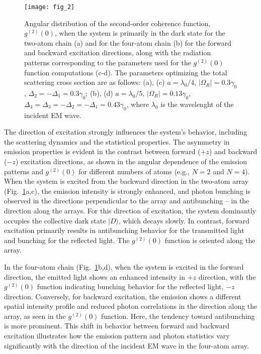 \documentclass[aps,prl,twocolumn,superscriptaddress,showpacs,amsmath,amssymb]{revtex4-2}
\begin{document}
\begin{figure}[h]
    \centering
    \texttt{[image: fig\_2]}
    \caption{Angular distribution of the second-order coherence function, $g^{(2)}(0)$, when the system is primarily in the dark state for the two-atom chain (a) and for the four-atom chain (b) for the forward and backward excitation directions, along with the radiation patterns corresponding to the
    parameters used for the $g^{(2)}(0)$ function computations (c-d). The parameters optimizing the total scattering cross section are as follows: (a), (c) $a = \lambda_0 / 4$, $ \left| \Omega_R \right|= 0.3 \gamma_0$, $\Delta_2 = - \Delta_1 = 0.3 \gamma_0$; (b), (d) $a = \lambda_0 / 5$,
    $\left| \Omega_R \right| = 0.13
\gamma_0$, $\Delta_4 = \Delta_3 = - \Delta_2 = - \Delta_1 = 0.43 \gamma_0$, where $\lambda_0$ is the wavelenght of the incident EM wave.}
    \label{fig:02}
\end{figure}

The direction of excitation strongly influences the system's behavior, including the scattering dynamics and the statistical properties. 
The asymmetry in emission properties is evident in the contrast between forward ($+z$) and backward ($-z$) excitation directions, as shown in the angular dependence of the emission patterns and $g^{(2)}(0)$ for different numbers of atoms (e.g., $N = 2$ and $N = 4$). 
When the system is excited from the backward direction in the two-atom array (Fig.~\ref{fig:02}a,c), the emission intensity is strongly enhanced, and photon bunching is observed in the directions perpendicular to the array and antibunching -- in the direction along the arrays.
For this direction of excitation, the system dominantly occupies the collective dark state $ |D\rangle $, which decays slowly. 
In contrast, forward excitation primarily results in antibunching behavior for the transmitted light and bunching for the reflected light.
The $g^{(2)}(0)$ function is oriented along the array.

In the four-atom chain (Fig.~\ref{fig:02}b,d), when the system is excited in the forward direction, the emitted light shows an enhanced intensity in $+z$ direction, with the $g^{(2)}(0)$ function indicating bunching behavior for the reflected light, $-z$ direction.
Conversely, for backward excitation, the emission shows a different spatial intensity profile and reduced photon correlations in the direction along the array, as seen in the $g^{(2)}(0)$ function. Here, the tendency toward antibunching is more prominent. This shift in behavior between forward and backward excitation illustrates how the emission pattern and photon statistics vary significantly with the direction of the incident EM wave in the four-atom array.
\end{document}
